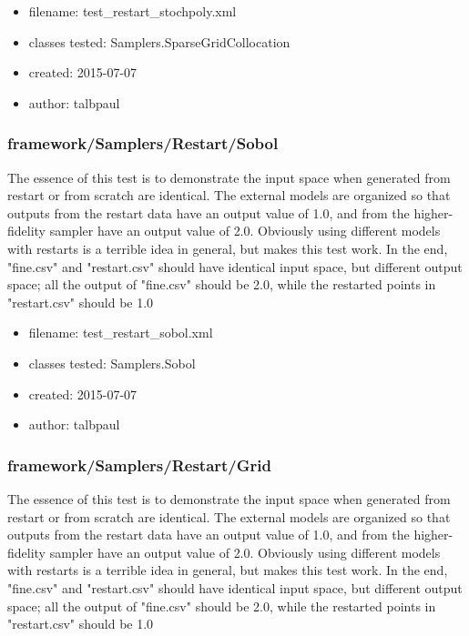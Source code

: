       \begin{itemize}
          \item filename: test\_restart\_stochpoly.xml
          \item classes tested: Samplers.SparseGridCollocation
          \item created: 2015-07-07
          \item author: talbpaul
      \end{itemize}
    \subsubsection{framework/Samplers/Restart/Sobol}
      
      The essence of this test is to demonstrate the input space when generated from restart or from scratch
      are identical.  The external models are organized so that outputs from the restart data have an
      output value of 1.0, and from the higher-fidelity sampler have an output value of 2.0.  Obviously using
      different models with restarts is a terrible idea in general, but makes this test work.
      In the end, "fine.csv" and "restart.csv" should have identical input space, but different output space;
      all the output of "fine.csv" should be 2.0, while the restarted points in "restart.csv" should be 1.0
    
      \begin{itemize}
          \item filename: test\_restart\_sobol.xml
          \item classes tested: Samplers.Sobol
          \item created: 2015-07-07
          \item author: talbpaul
      \end{itemize}
    \subsubsection{framework/Samplers/Restart/Grid}
      
      The essence of this test is to demonstrate the input space when generated from restart or from scratch
      are identical.  The external models are organized so that outputs from the restart data have an
      output value of 1.0, and from the higher-fidelity sampler have an output value of 2.0.  Obviously using
      different models with restarts is a terrible idea in general, but makes this test work.
      In the end, "fine.csv" and "restart.csv" should have identical input space, but different output space;
      all the output of "fine.csv" should be 2.0, while the restarted points in "restart.csv" should be 1.0
    
